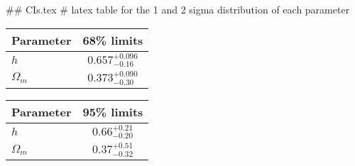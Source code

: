 ## CIs.tex
# latex table for the 1 and 2 sigma distribution of each parameter

\begin{tabular} { l  c}
 Parameter &  68\% limits\\
\hline
{\boldmath$h              $} & $0.657^{+0.096}_{-0.16}    $\\
{\boldmath$\Omega_m       $} & $0.373^{+0.090}_{-0.30}    $\\
\hline
\end{tabular}

\begin{tabular} { l  c}
 Parameter &  95\% limits\\
\hline
{\boldmath$h              $} & $0.66^{+0.21}_{-0.20}      $\\
{\boldmath$\Omega_m       $} & $0.37^{+0.51}_{-0.32}      $\\
\hline
\end{tabular}
